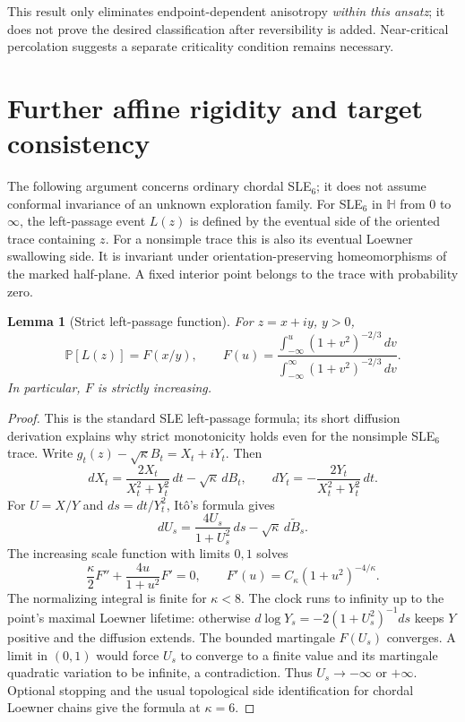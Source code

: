 \documentclass[11pt]{article}
\newtheorem{lemma}[theorem]{Lemma}
\theoremstyle{definition}\newtheorem{definition}[theorem]{Definition}
\theoremstyle{remark}\newtheorem{remark}[theorem]{Remark}
\begin{document}
This result only eliminates endpoint-dependent anisotropy \emph{within this
ansatz}; it does not prove the desired classification after reversibility
is added.  Near-critical percolation suggests a separate criticality
condition remains necessary.

\section{Further affine rigidity and target consistency}
The following argument concerns ordinary chordal SLE$_6$; it does not
assume conformal invariance of an unknown exploration family.
For SLE$_6$ in $\mathbb H$ from $0$ to $\infty$, the left-passage event $L(z)$
is defined by the eventual side of the oriented trace containing $z$.
For a nonsimple trace this is also its eventual Loewner swallowing side.
It is invariant under orientation-preserving homeomorphisms of the marked
half-plane. A fixed interior point belongs to the trace with probability zero.

\begin{lemma}[Strict left-passage function]
\label{lem:am-left}
For $z=x+iy$, $y>0$,
\[
 \mathbb P[L(z)]=F(x/y),\qquad
 F(u)=\frac{\int_{-\infty}^u(1+v^2)^{-2/3}\,dv}
 {\int_{-\infty}^{\infty}(1+v^2)^{-2/3}\,dv}.
\]
In particular, $F$ is strictly increasing.
\end{lemma}
\begin{proof}
This is the standard SLE left-passage formula; its short diffusion derivation
explains why strict monotonicity holds even for the nonsimple SLE$_6$ trace.
Write $g_t(z)-\sqrt\kappa B_t=X_t+iY_t$. Then
\[
 dX_t=\frac{2X_t}{X_t^2+Y_t^2}\,dt-\sqrt\kappa\,dB_t,
 \qquad dY_t=-\frac{2Y_t}{X_t^2+Y_t^2}\,dt.
\]
For $U=X/Y$ and $ds=dt/Y_t^2$, It\^o's formula gives
\[
 dU_s=\frac{4U_s}{1+U_s^2}\,ds-\sqrt\kappa\,d\widetilde B_s.
\]
The increasing scale function with limits $0,1$ solves
\[
 \frac\kappa2 F''+\frac{4u}{1+u^2}F'=0,
 \qquad F'(u)=C_\kappa(1+u^2)^{-4/\kappa}.
\]
The normalizing integral is finite for $\kappa<8$. The clock runs to
infinity up to the point's maximal Loewner lifetime: otherwise
$d\log Y_s=-2(1+U_s^2)^{-1}ds$ keeps $Y$ positive and the diffusion extends.
The bounded martingale $F(U_s)$ converges. A limit in $(0,1)$ would force
$U_s$ to converge to a finite value and its martingale quadratic variation
to be infinite, a contradiction. Thus $U_s\to-\infty$ or $+\infty$.
Optional stopping and the usual topological side identification for
chordal Loewner chains give the formula at $\kappa=6$.
\end{proof}
\end{document}
